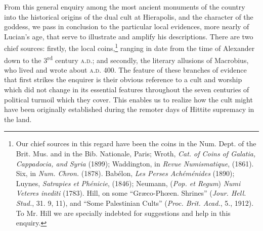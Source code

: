 \documentclass[a4paper, 11pt, oneside, polutonikogreek, english]{article}
\begin{document}
From this general enquiry among the most ancient monuments of the country into the historical origins of the dual cult at Hierapolis, and the character of the goddess, we pass in conclusion to the particular local evidences, more nearly of Lucian's age, that serve to illustrate and amplify his descriptions. There are two chief sources: firstly, the local coins,\footnote{Our chief sources in this regard have been the coins in the Num. Dept. of the Brit. Mus. and in the Bib. Nationale, Paris; Wroth, \emph{Cat. of Coins of Galatia, Cappadocia, and Syria} (1899); Waddington, in \emph{Revue Numismatique}, (1861). Six, in \emph{Num. Chron.} (1878).  Babélon, \emph{Les Perses Achéménides} (1890); Luynes, \emph{Satrapies et Phénicie}, (1846); Neumann, (\emph{Pop. et Regum}) \emph{Numi Veteres inediti} (1783). Hill, on some ``Græco-Phœen. Shrines'' (\emph{Jour. Hell. Stud.}, 31. 9, 11), and ``Some Palestinian Cults'' (\emph{Proc. Brit. Acad.}, 5., 1912). To Mr. Hill we are specially indebted for suggestions and help in this enquiry.} ranging in date from the time of Alexander down to the 3\textsuperscript{rd} century \textsc{a.d.}; and secondly, the literary allusions of Macrobius, who lived and wrote about \textsc{a.d.} 400. The feature of these branches of evidence that first strikes the enquirer is their obvious reference to a cult and worship which did not change in its essential features throughout the seven centuries of political turmoil which they cover. This enables us to realize how the cult might have been originally established during the remoter days of Hittite supremacy in the land.
\end{document}
